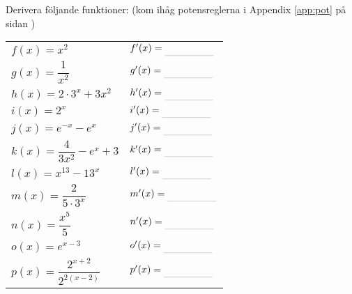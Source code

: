 \documentclass[a4paper, 12pt]{article}
\begin{document}
\begin{blu}
    Derivera följande funktioner: (kom ihåg potensreglerna i Appendix \ref*{app:pot} på sidan \pageref*{app:pot})
    
    \begin{itemize}
        \begin{tabular}[b]{p{10em} p{20em}}
            \item $f(x) = x^2$  & \item[] $ f'(x) \ans $ \\
            \item $g(x) = \dfrac{1}{x^2} $ & \item[] $g'(x) \ans$ \\
            \item $h(x) = 2\cdot 3^x + 3x^2 $ & \item[] $h'(x) \ans$ \\
            \item $i(x) = 2^x $ & \item[] $i'(x) \ans$\\
            \item $j(x) = e^{-x} - e^x $ & \item[] $j'(x) \ans$\\
            \item $k(x) = \dfrac{4}{3x^2}-e^x + 3 $ & \item[] $k'(x) \ans$\\
            \item $l(x) = x^{13} - 13^x $ & \item[] $ l'(x) \ans$ \\
            \item $m(x) = \dfrac{2}{5\cdot 3^x} $ & \item[] $ m'(x) \ans$ \\
            \item $n(x) = \dfrac{x^5}{5} $ & \item[] $ n'(x) \ans$ \\
            \item $o(x) = e^{x-3} $ & \item[] $ o'(x) \ans$ \\
            \item $p(x) = \dfrac{2^{x+2}}{2^{2(x-2)}}$ & \item[] $ p'(x) \ans$ \\
        \end{tabular}
    
    \end{itemize}
    
\end{blu}
\end{document}
